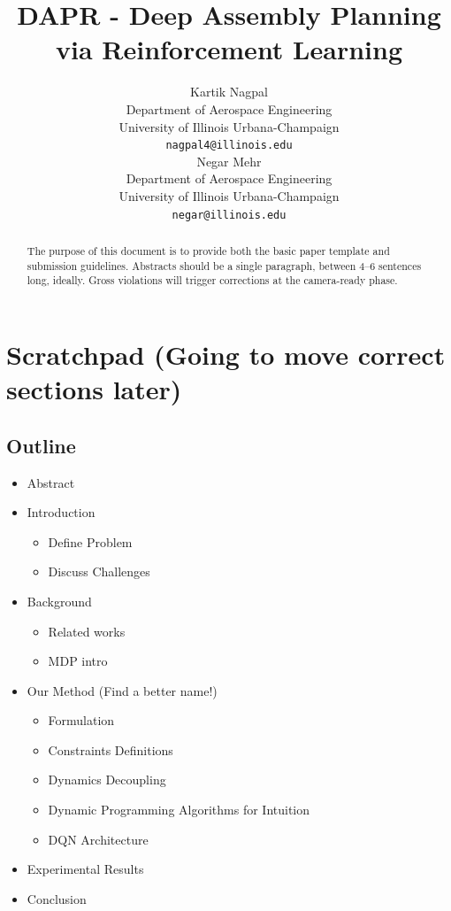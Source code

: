 \documentclass{article}
\title{DAPR - Deep Assembly Planning via Reinforcement Learning}
\author{
  Kartik Nagpal\\
  Department of Aerospace Engineering\\
  University of Illinois Urbana-Champaign\\
  \texttt{nagpal4@illinois.edu} \\
  \And
  Negar Mehr \\
  Department of Aerospace Engineering\\
  University of Illinois Urbana-Champaign\\
  \texttt{negar@illinois.edu} \\
}
\begin{document}
\maketitle


\begin{abstract}
    The purpose of this document is to provide both the basic paper template and submission guidelines. Abstracts should be a single paragraph, between 4--6 sentences long, ideally. Gross violations will trigger corrections at the camera-ready phase.
\end{abstract}



\section{Scratchpad {\color{red} (Going to move correct sections later)}}

\subsection{Outline}
\begin{itemize}
 \item Abstract
 \item Introduction
 \begin{itemize}
     \item Define Problem
     \item Discuss Challenges
 \end{itemize}
 \item Background
 \begin{itemize}
    \item Related works
    \item MDP intro
 \end{itemize}
 \item Our Method (Find a better name!)
 \begin{itemize}
     \item Formulation
     \item Constraints Definitions
     \item Dynamics Decoupling
     \item Dynamic Programming Algorithms for Intuition
     \item DQN Architecture
 \end{itemize}
 \item Experimental Results
 \item Conclusion
\end{itemize}
\end{document}
